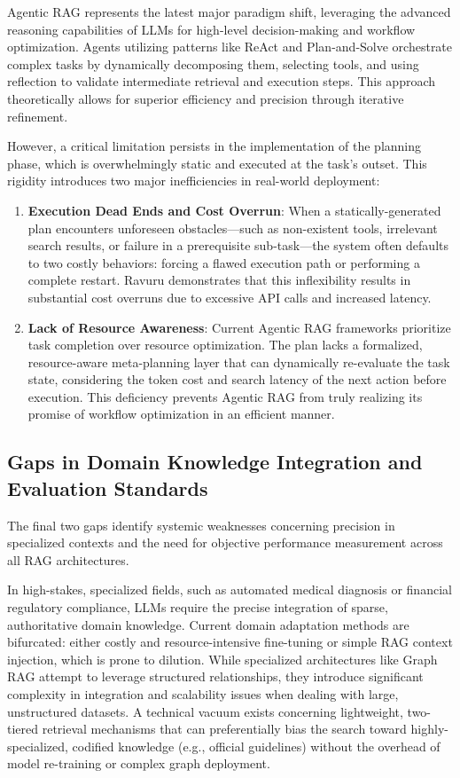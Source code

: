 \documentclass[12pt,en]{elegantpaper}
\begin{document}
Agentic RAG \cite{ravuru2024agentic} represents the latest major paradigm shift, leveraging the advanced reasoning capabilities of LLMs for high-level decision-making and workflow optimization. Agents utilizing patterns like ReAct \cite{yao2023react} and Plan-and-Solve orchestrate complex tasks by dynamically decomposing them, selecting tools, and using reflection to validate intermediate retrieval and execution steps. This approach theoretically allows for superior efficiency and precision through iterative refinement.

However, a critical limitation persists in the implementation of the planning phase, which is overwhelmingly static and executed at the task's outset. This rigidity introduces two major inefficiencies in real-world deployment:

\begin{enumerate}
  \item \textbf{Execution Dead Ends and Cost Overrun}: When a statically-generated plan encounters unforeseen obstacles—such as non-existent tools, irrelevant search results, or failure in a prerequisite sub-task—the system often defaults to two costly behaviors: forcing a flawed execution path or performing a complete restart. Ravuru \cite{ravuru2024agentic} demonstrates that this inflexibility results in substantial cost overruns due to excessive API calls and increased latency.
  \item \textbf{Lack of Resource Awareness}: Current Agentic RAG frameworks prioritize task completion over resource optimization. The plan lacks a formalized, resource-aware meta-planning layer that can dynamically re-evaluate the task state, considering the token cost and search latency of the next action before execution. This deficiency prevents Agentic RAG from truly realizing its promise of workflow optimization in an efficient manner.
\end{enumerate}

\subsection{Gaps in Domain Knowledge Integration and Evaluation Standards}

The final two gaps identify systemic weaknesses concerning precision in specialized contexts and the need for objective performance measurement across all RAG architectures.

In high-stakes, specialized fields, such as automated medical diagnosis or financial regulatory compliance, LLMs require the precise integration of sparse, authoritative domain knowledge. Current domain adaptation methods are bifurcated: either costly and resource-intensive fine-tuning or simple RAG context injection, which is prone to dilution. \cite{wang2025efficient} While specialized architectures like Graph RAG attempt to leverage structured relationships, they introduce significant complexity in integration and scalability issues when dealing with large, unstructured datasets. A technical vacuum exists concerning lightweight, two-tiered retrieval mechanisms that can preferentially bias the search toward highly-specialized, codified knowledge (e.g., official guidelines) without the overhead of model re-training or complex graph deployment.
\end{document}
